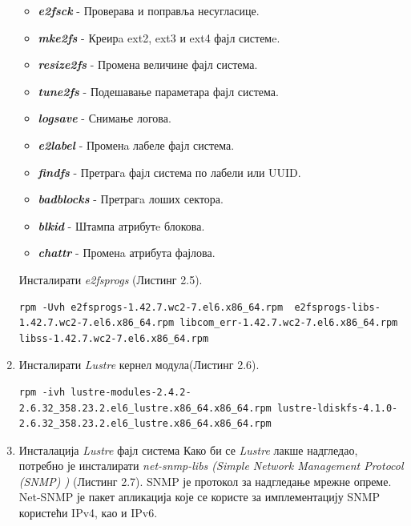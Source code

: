 \begin{enumerate}
\begin{itemize}
\item \textbf{\textit{e2fsck}} - Проверава и поправља несугласице.
\item \textbf{\textit{mke2fs}} - Креирa ext2, ext3 и ext4 фајл системe.
\item \textbf{\textit{resize2fs}} - Промена величине фајл система.
\item \textbf{\textit{tune2fs}} - Подешавање параметара фајл система.
\item \textbf{\textit{logsave}} - Снимање логова.
\item \textbf{\textit{e2label}} - Променa лабеле фајл система.
\item \textbf{\textit{findfs}} - Претрагa фајл система по лабели или UUID.
\item \textbf{\textit{badblocks}} - Претрагa лоших сектора.
\item \textbf{\textit{blkid}} - Штампа атрибутe блокова.
\item \textbf{\textit{chattr}}  - Променa атрибута фајлова.
\end{itemize}

Инсталирати \textit{e2fsprogs} (Листинг 2.5).

\begin{lstlisting}[style=nonumbers,frame=single,caption=Инсталација \textit{e2fsprogs}]
rpm -Uvh e2fsprogs-1.42.7.wc2-7.el6.x86_64.rpm  e2fsprogs-libs-1.42.7.wc2-7.el6.x86_64.rpm libcom_err-1.42.7.wc2-7.el6.x86_64.rpm libss-1.42.7.wc2-7.el6.x86_64.rpm 
\end{lstlisting}

\item  Инсталирати   \textit{Lustre} кернел модула(Листинг 2.6).

\begin{lstlisting}[style=nonumbers,frame=single,caption=Инсталација кернел модула]
rpm -ivh lustre-modules-2.4.2-2.6.32_358.23.2.el6_lustre.x86_64.x86_64.rpm lustre-ldiskfs-4.1.0-2.6.32_358.23.2.el6_lustre.x86_64.x86_64.rpm
\end{lstlisting}

\item Инсталација   \textit{Lustre} фајл система 
Како би се   \textit{Lustre} лакше надгледао, потребно је инсталирати \textit{net-snmp-libs (Simple Network Management Protocol (\gls{SNMP}) )} (Листинг 2.7). SNMP је протокол за надгледање мрежне опреме. Net-SNMP је пакет апликација које се користе за имплементацију SNMP користећи IPv4, као и IPv6.


\end{enumerate}
